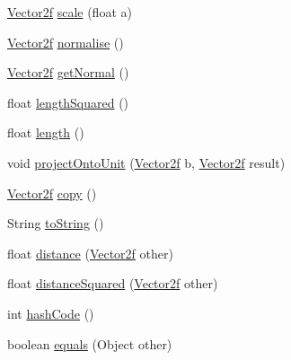 \begin{DoxyCompactItemize}
\mbox{\hyperlink{classorg_1_1newdawn_1_1slick_1_1geom_1_1_vector2f}{Vector2f}} \mbox{\hyperlink{classorg_1_1newdawn_1_1slick_1_1geom_1_1_vector2f_afce66facdf9a71f94a0155901b743b6d}{scale}} (float a)
\item 
\mbox{\hyperlink{classorg_1_1newdawn_1_1slick_1_1geom_1_1_vector2f}{Vector2f}} \mbox{\hyperlink{classorg_1_1newdawn_1_1slick_1_1geom_1_1_vector2f_a77254e3a0ea6513b390d0c283ae8cf55}{normalise}} ()
\item 
\mbox{\hyperlink{classorg_1_1newdawn_1_1slick_1_1geom_1_1_vector2f}{Vector2f}} \mbox{\hyperlink{classorg_1_1newdawn_1_1slick_1_1geom_1_1_vector2f_a46e844df14e38b24eafc60842bf50c66}{get\+Normal}} ()
\item 
float \mbox{\hyperlink{classorg_1_1newdawn_1_1slick_1_1geom_1_1_vector2f_a1c4197040609de8f2ef13fc3342ee7da}{length\+Squared}} ()
\item 
float \mbox{\hyperlink{classorg_1_1newdawn_1_1slick_1_1geom_1_1_vector2f_ada298fe38d235371020523e9655e9152}{length}} ()
\item 
void \mbox{\hyperlink{classorg_1_1newdawn_1_1slick_1_1geom_1_1_vector2f_a801d1bc50a68d7fcab1708506967b502}{project\+Onto\+Unit}} (\mbox{\hyperlink{classorg_1_1newdawn_1_1slick_1_1geom_1_1_vector2f}{Vector2f}} b, \mbox{\hyperlink{classorg_1_1newdawn_1_1slick_1_1geom_1_1_vector2f}{Vector2f}} result)
\item 
\mbox{\hyperlink{classorg_1_1newdawn_1_1slick_1_1geom_1_1_vector2f}{Vector2f}} \mbox{\hyperlink{classorg_1_1newdawn_1_1slick_1_1geom_1_1_vector2f_a3f38eacefe225aef76d800a07267db32}{copy}} ()
\item 
String \mbox{\hyperlink{classorg_1_1newdawn_1_1slick_1_1geom_1_1_vector2f_ad5fb60f8d54de85fb1c8f15ef10ee9b7}{to\+String}} ()
\item 
float \mbox{\hyperlink{classorg_1_1newdawn_1_1slick_1_1geom_1_1_vector2f_a0c78cd993e1ccefe024b695381fabb5c}{distance}} (\mbox{\hyperlink{classorg_1_1newdawn_1_1slick_1_1geom_1_1_vector2f}{Vector2f}} other)
\item 
float \mbox{\hyperlink{classorg_1_1newdawn_1_1slick_1_1geom_1_1_vector2f_a1c97567a2a84307f2022327c80d6d124}{distance\+Squared}} (\mbox{\hyperlink{classorg_1_1newdawn_1_1slick_1_1geom_1_1_vector2f}{Vector2f}} other)
\item 
int \mbox{\hyperlink{classorg_1_1newdawn_1_1slick_1_1geom_1_1_vector2f_a554b68db2496c97b8d4d84c12c5aef4e}{hash\+Code}} ()
\item 
boolean \mbox{\hyperlink{classorg_1_1newdawn_1_1slick_1_1geom_1_1_vector2f_a064d1ba4d71fc4ebf1d6fa8adca00784}{equals}} (Object other)
\end{DoxyCompactItemize}

